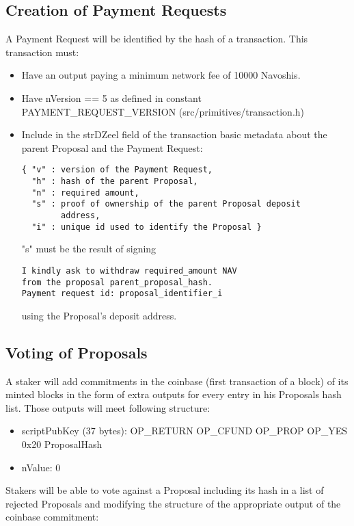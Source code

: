 \documentclass{artikel1}
\begin{document}
\begin{flushleft}
\subsection{Creation of Payment Requests}

A Payment Request will be identified by the hash of a transaction. This transaction must:

\begin{itemize}
\item Have an output paying a minimum network fee of 10000 Navoshis.
\item Have nVersion == 5 as defined in constant PAYMENT\_REQUEST\_VERSION (src/primitives/transaction.h) 
\item Include in the strDZeel field of the transaction basic metadata about the parent Proposal and the Payment Request:
\begin{lstlisting}
{ "v" : version of the Payment Request,
  "h" : hash of the parent Proposal,
  "n" : required amount,
  "s" : proof of ownership of the parent Proposal deposit
        address,
  "i" : unique id used to identify the Proposal }
\end{lstlisting}
"s" must be the result of signing
\begin{lstlisting}
I kindly ask to withdraw required_amount NAV
from the proposal parent_proposal_hash.
Payment request id: proposal_identifier_i
\end{lstlisting}

using the Proposal's deposit address.

\end{itemize}

\subsection{Voting of Proposals}

A staker will add commitments in the coinbase (first transaction of a block) of its minted blocks in the form of extra outputs for every entry in his Proposals hash list. Those outputs will meet following structure:

\begin{itemize}
\item scriptPubKey (37 bytes): OP\_RETURN OP\_CFUND OP\_PROP OP\_YES 0x20 ProposalHash 
\item nValue: 0
\end{itemize}

Stakers will be able to vote against a Proposal including its hash in a list of rejected Proposals and modifying the structure of the appropriate output of the coinbase commitment:


\end{flushleft}
\end{document}
